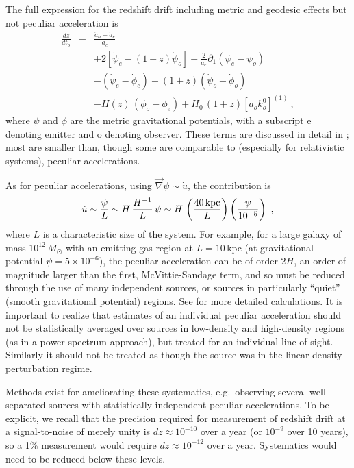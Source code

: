 \documentclass[preprint2, 10pt]{aastex}
\newcommand{\be}{\begin{equation}}
\newcommand{\ee}{\end{equation}}
\newcommand{\bea}{\begin{eqnarray}}
\newcommand{\eea}{\end{eqnarray}}
\begin{document}
{The full expression for the redshift drift including metric and geodesic 
effects but not peculiar acceleration is 
\bea 
\frac{dz}{dt_o}&=&\frac{\dot a_o-\dot a_e}{a_e}\\ 
&&+2[\dot\psi_e-(1+z)\dot\psi_o]
+\frac{2}{a_e}\partial_1(\psi_e-\psi_o)\nonumber\\ 
&&-(\dot\psi_e-\dot\phi_e)+(1+z)(\dot\psi_o-\dot\phi_o)\nonumber\\ 
&&-H(z)\,(\phi_o-\phi_e)+H_0\,(1+z)[a_o k^0_o]^{(1)}\ ,\nonumber  
\eea 
where $\psi$ and $\phi$ are the metric gravitational potentials, 
with a subscript e denoting emitter and o denoting observer. 
These terms are discussed in detail in \citet{10044646}; most are smaller 
than, though some are comparable to (especially for relativistic systems), 
peculiar accelerations. 

As for peculiar accelerations, using 
$\vec\nabla\psi\sim \dot u$, the contribution is 
\be 
\dot u \sim \frac{\psi}{L}\sim H\,\frac{H^{-1}}{L}\,\psi\sim H\, 
\left(\frac{40\,{\rm kpc}}{L}\right)\left(\frac{\psi}{10^{-5}}\right)\ , 
\ee 
where $L$ is a characteristic size of the system. 
For example, for a 
large galaxy of mass $10^{12}\,M_\odot$ with an emitting gas 
region at $L=10\,$kpc (at gravitational potential $\psi=5\times 10^{-6}$), 
the peculiar acceleration can be of order $2H$, an order of magnitude 
larger than the first, McVittie-Sandage term, and so must be reduced through 
the use of many independent sources, or sources in particularly ``quiet'' 
(smooth gravitational potential) regions.
See \citet{2008PhLB..660...81A,2008PhRvD..77b1301U} for 
more detailed calculations. It is important to realize that estimates of 
an individual peculiar acceleration should not be statistically averaged 
over sources in 
low-density and high-density regions (as in a power spectrum approach), 
but treated for an individual line of sight. 
Similarly it should not be treated as though the source was in the linear 
density perturbation regime. 

Methods exist for ameliorating these systematics, e.g.\ observing several 
well separated sources 
with statistically independent peculiar accelerations. 
To be explicit, 
we recall that the precision required for measurement of 
redshift drift at a signal-to-noise of merely unity is 
$dz\approx 10^{-10}$ over a year (or $10^{-9}$ over 10 years), 
so a 1\% measurement would require $dz\approx 10^{-12}$ over a year.  
Systematics would need to be reduced below these levels. 


}
\end{document}
